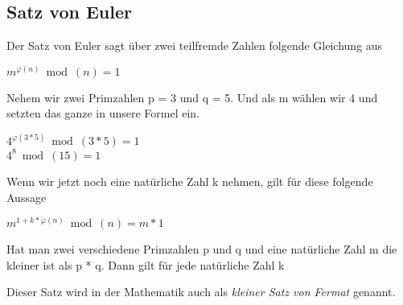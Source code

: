 \subsection{Satz von Euler}
Der Satz von Euler sagt über zwei teilfremde Zahlen folgende Gleichung aus
\begin{center}
$ m^{\varphi(n)} \bmod(n) = 1 $
\end{center}
Nehem wir zwei Primzahlen p = 3 und q = 5. Und als m wählen wir 4 und setzten das ganze in unsere Formel ein.\\
\begin{center}
$ 4^{\varphi(3 * 5)} \bmod(3 * 5) = 1 $ \\
$ 4^8 \bmod(15) = 1 $ \\
\end{center}
Wenn wir jetzt noch eine natürliche Zahl k nehmen, gilt für diese folgende Aussage \\
\begin{center}
$ m^{1 + k * \varphi(n)} \bmod(n)  = m * 1$ \\
\end{center}
Hat man zwei verschiedene Primzahlen p und q und eine natürliche Zahl m die kleiner ist als p * q. Dann gilt für jede natürliche Zahl k \\
\begin{center}
\end{center}
Dieser Satz wird in der Mathematik auch als \textit{kleiner Satz von Fermat} genannt.
